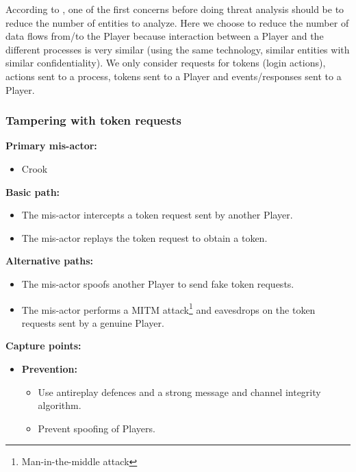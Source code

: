 \documentclass[a4paper,11pt]{report}
\begin{document}
According to \cite[p117]{1202957}, one of the first concerns before doing threat analysis should be to reduce the number of entities to analyze.
Here we choose to reduce the number of data flows from/to the Player because interaction between a Player and the different processes is very similar (using the same technology, similar entities with similar confidentiality). We only consider requests for tokens (login actions), actions sent to a process, tokens sent to a Player and events/responses sent to a Player.

\subsubsection{Tampering with token requests}
\label{PlayerFlowCasesT1}
\textbf{Primary mis-actor:}
\begin{itemize}
\item Crook
\end{itemize}
\textbf{Basic path:}
\begin{itemize}
\item The mis-actor intercepts a token request sent by another Player.
\item The mis-actor replays the token request to obtain a token.
\end{itemize}
\textbf{Alternative paths:}
\begin{itemize}
\item The mis-actor spoofs another Player to send fake token requests.
\item The mis-actor performs a MITM attack\footnote{Man-in-the-middle attack} and eavesdrops on the token requests sent by a genuine Player.
\end{itemize}
\textbf{Capture points:}
\begin{itemize}
\item \textbf{Prevention:}
\begin{itemize}
\item Use antireplay defences and a strong message and channel integrity algorithm.
\item Prevent spoofing of Players.
\end{itemize}
\end{itemize}
\end{document}
